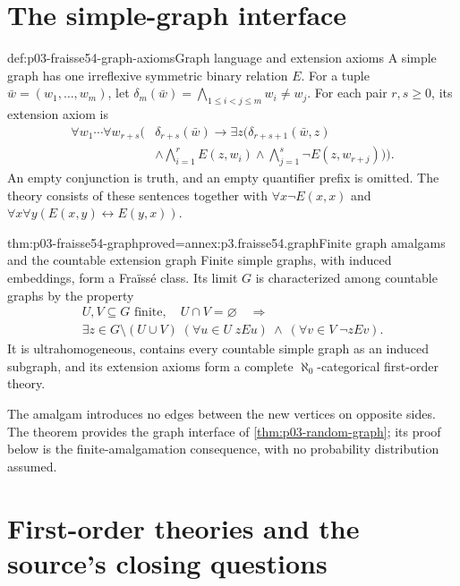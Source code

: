 \section{The simple-graph interface}
\label{sec:p03-fraisse54-graph}

\begin{hbdefinition}{def:p03-fraisse54-graph-axioms}{Graph language and extension axioms}
A simple graph has one irreflexive symmetric binary relation \(E\).
For a tuple \(\bar w=(w_1,\ldots,w_m)\), let
\(\delta_m(\bar w)=\bigwedge_{1\leq i<j\leq m}w_i\ne w_j\).
For each pair \(r,s\geq0\), its extension axiom is
\[
 \begin{split}
 \forall w_1\cdots\forall w_{r+s}\bigl(&\delta_{r+s}(\bar w)\to
 \exists z\bigl(\delta_{r+s+1}(\bar w,z)\\
 &\land\bigwedge_{i=1}^{r}E(z,w_i)
 \land\bigwedge_{j=1}^{s}\neg E(z,w_{r+j})\bigr)\bigr).
 \end{split}
\]
An empty conjunction is truth, and an empty quantifier prefix is omitted.
The theory consists of these sentences together with
\(\forall x\neg E(x,x)\) and
\(\forall x\forall y(E(x,y)\leftrightarrow E(y,x))\).
\end{hbdefinition}

\begin{hbtheorem}{thm:p03-fraisse54-graph}{proved=annex:p3.fraisse54.graph}{Finite graph amalgams and the countable extension graph}
Finite simple graphs, with induced embeddings, form a Fra\"iss\'e class.
Its limit \(G\) is characterized among countable graphs by the property
\[
 \begin{gathered}
 U,V\subseteq G\text{ finite},\quad U\cap V=\varnothing
 \quad\Longrightarrow\\
 \exists z\in G\setminus(U\cup V)\;
   (\forall u\in U\;zEu)\ \land\ (\forall v\in V\;\neg zEv).
 \end{gathered}
\]
It is ultrahomogeneous, contains every countable simple graph as an induced
subgraph, and its extension axioms form a complete
\(\aleph_0\)-categorical first-order theory.
\end{hbtheorem}

The amalgam introduces
no edges between the new vertices on opposite sides. The theorem provides
the graph interface of \cref{thm:p03-random-graph}; its proof below is the
finite-amalgamation consequence, with no probability distribution assumed.

\section{First-order theories and the source's closing questions}
\label{sec:p03-fraisse54-logical-application}


